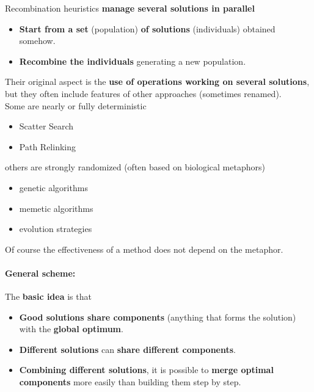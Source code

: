 \documentclass[11pt]{article}
\begin{document}
	Recombination heuristics \textbf{manage several solutions in parallel}
	\begin{itemize}
		\item \textbf{Start from a set} (population) \textbf{of solutions} (individuals) obtained somehow.\\
		
		\item \textbf{Recombine the individuals} generating a new population.\\
	\end{itemize}
	
	Their original aspect is the \textbf{use of operations working on several solutions}, but they often include features of other approaches (sometimes renamed).\\
	
	Some are nearly or fully deterministic
	\begin{itemize}
		\item Scatter Search
		\item Path Relinking
	\end{itemize}
	
	others are strongly randomized (often based on biological metaphors)
	\begin{itemize}
		\item genetic algorithms
		\item memetic algorithms
		\item evolution strategies
	\end{itemize}
	
	Of course the effectiveness of a method does not depend on the metaphor.\\
	
	\newpage
	
	\paragraph{General scheme:} The \textbf{basic idea} is that
	\begin{itemize}
		\item \textbf{Good solutions share components} (anything that forms the solution) with the \textbf{global optimum}.\\
		
		\item \textbf{Different solutions} can \textbf{share different components}.\\
		
		\item \textbf{Combining different solutions}, it is possible to \textbf{merge optimal components} more easily than building them step by step.\\
	\end{itemize}
	
\end{document}
